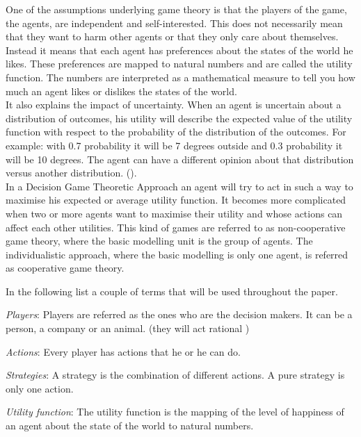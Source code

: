 One of the assumptions underlying game theory is that the players of the game, the agents, are independent and self-interested. This does not necessarily mean that they want to harm other agents or that they only care about themselves. 
Instead it means that each agent has preferences about the states of the world he likes. These preferences are mapped to natural numbers and are called the utility function. The numbers are interpreted as a mathematical measure to tell you how much an agent likes or dislikes the states of the world. \\
It also explains the impact of uncertainty. When an agent is uncertain about a distribution of outcomes, his utility will describe the expected value of the utility function with respect to the probability of the distribution of the outcomes. For example: with 0.7 probability it will be 7 degrees outside and 0.3 probability it will be 10 degrees. The agent can have a different opinion about that distribution versus another distribution. ().\\
In a Decision Game Theoretic Approach an agent will try to act in such a way to maximise his expected or average utility function. It becomes more complicated when two or more agents want to maximise their utility and whose actions can affect each other utilities. This kind of games are referred to as non-cooperative game theory, where the basic modelling unit is the group of agents. The individualistic approach, where the basic modelling is only one agent, is referred as cooperative game theory. 


In the following list a couple of terms that will be used throughout the paper.
\begin{description}
\item \textit{Players}: Players are referred as the ones who are the decision makers. It can be a person, a company or an animal.  (they will act rational )
\item \textit{Actions}: Every player has actions that he or he can do. 
\item \textit{Strategies}: A strategy is the combination of different actions. A pure strategy is only one action.
\item \textit{Utility function}: The utility function is the mapping of the level of happiness of an agent about the state of the world to natural numbers.

\end{description}

